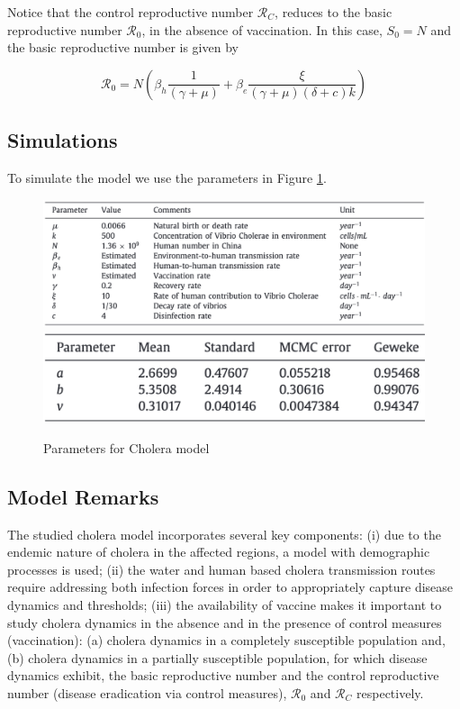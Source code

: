 \documentclass{book}
\begin{document}
Notice that the control reproductive number $\mathcal{R}_C$, reduces to the basic reproductive number $\mathcal{R}_0$, in the absence of vaccination. In this case, $S_0=N$ and the basic reproductive number is given by

    \begin{equation}
    \mathcal{R}_0=N\left(\beta_{h} \frac{ 1}{(\gamma+\mu)}+\beta_{e} \frac{ \xi}{(\gamma+\mu)(\delta+c) k}\right)
\end{equation}

\subsection*{Simulations}
To simulate the model we use the parameters in Figure \ref{fig:cholera_pars}.

%
\begin{figure}[H]
    \centering
    \includegraphics[scale=0.35]{cholera1}
    \includegraphics[scale=0.35]{cholera2}
    \caption{Parameters for Cholera model}
    \label{fig:cholera_pars}
\end{figure}

\subsection*{Model Remarks}
The studied cholera model incorporates several key components: 
%
(i) due to the endemic nature of cholera in the affected regions, a model with demographic processes is used;
%
(ii) the water and human based cholera transmission routes require addressing both infection forces in order to appropriately capture disease dynamics and thresholds;
%
(iii) the availability of vaccine makes it important to study cholera dynamics in the absence and in the presence of control measures (vaccination): (a) cholera dynamics in a completely susceptible population and, (b) cholera dynamics in a partially susceptible population, for which disease dynamics exhibit, the basic reproductive number and the control reproductive number (disease eradication via control measures), $\mathcal{R}_0$ and $\mathcal{R}_C$ respectively.
\end{document}
